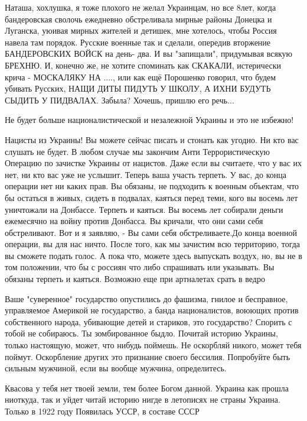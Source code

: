 Наташа, хохлушка, я тоже плохого не желал Украинцам, но все 8лет, когда
бандеровская сволочь ежедневно обстреливала мирные районы Донецка и Луганска,
уюивая мирных жителей и детишек, мне хотелось, чтобы Россия навела там порядок.
Русские военные так и сделали, опередив вторжение БАНДЕРОВСКИХ ВОЙСК на день-
два. И вы "запищали", придумывая всякую БРЕХНЮ. И, конечно же, не хотите
споминать как СКАКАЛИ, истерически крича - МОСКАЛЯКУ НА ...., или как ещё
Порошенко говорил, что будем убивать Русских, НАЩИ ДИТЫ ПИДУТЬ У ШКОЛУ, А ИХНИ
БУДУТЬ СЫДИТЬ У ПИДВАЛАХ. Забыла? Хочешь, пришлю его речь...


Не будет больше националистической и незалежной Украины и это не избежно!

Нацисты из Украины! Вы можете сейчас писать и стонать как угодно. Ни кто вас
слушать не будет. В любом случае мы закончим Анти Террористическую Операцию по
зачистке Украины от нацистов. Даже если вы считаете, что у вас их нет, ни кто
вас уже не услышит. Теперь ваша участь терпеть. У вас, до конца операции нет ни
каких прав. Вы обязаны, не подходить к военным объектам, что бы остаться в
живых, сидеть в подвалах, каяться перед теми, кого вы восемь лет уничтожали на
Донбассе. Терпеть и каяться. Вы восемь лет собирали деньги ежемесячно на войну
против Донбасса. Вы кричали, что они сами себя обстреливают. Вот и я заявляю, -
Вы сами себя обстреливаете.До конца военной операции, вы для нас ничто. После
того, как мы зачистим всю территорию, тогда вы сможете подать голос. А пока
что, можете здесь выпускать воздух, но, вы не в том положении, что бы с россиян
что либо спрашивать или указывать. Вы обязаны терпеть и каяться. Возможно еще
при артналетах срать в ведро

Ваше "суверенное" государство опустились до фашизма, гнилое и бесправное,
управляемое Америкой не государство, а банда националистов, воюющих против
собственного народа, убивающие детей и стариков, это государство? Спорить с
тобой не собираюсь. Ты зомбированное быдло. Почитай историю Украины, только
настоящую, может, что нибудь поймешь. Не оскорбляй никого, может тебя поймут.
Оскорбление других это признание своего бессилия. Попробуйте быть сильным
мужчиной, если вы вообще мужчина, определитесь.

Квасова у тебя нет твоей земли, тем более Богом данной. Украина как прошла
ниоткуда, так и уйдет читай историю нигде в летописях не страны Украина. Только
в 1922 году Появилась УССР, в составе СССР

